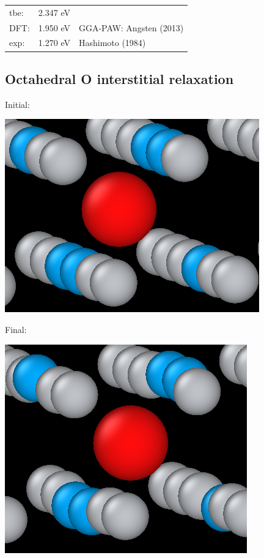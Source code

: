 \documentclass[11pt]{article}
\begin{document}
\begin{center}
\begin{tabular}{lll}
tbe: & 2.347  eV & \\
DFT: & 1.950  eV & GGA-PAW:   Angsten  (2013)\\
exp: & 1.270  eV & Hashimoto  (1984)\\
\end{tabular}
\end{center}

\subsection{Octahedral O interstitial relaxation}
\label{sec:org9785b99}

Initial:
\begin{center}
\includegraphics[width=.9\linewidth]{Images/initial_octahedral_ox_ovito.png}
\end{center}

Final:
\begin{center}
\includegraphics[width=.9\linewidth]{Images/final_octahedral_ox_ovito.png}
\end{center}
\end{document}
